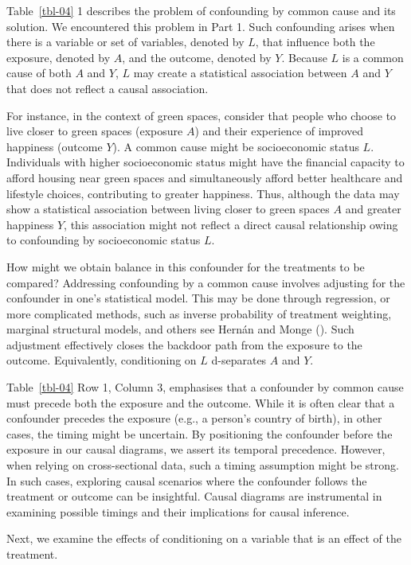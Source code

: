 \documentclass[
  singlecolumn]{article}
\begin{document}
Table~\ref{tbl-04} 1 describes the problem of confounding by common
cause and its solution. We encountered this problem in Part 1. Such
confounding arises when there is a variable or set of variables, denoted
by \(L\), that influence both the exposure, denoted by \(A\), and the
outcome, denoted by \(Y.\) Because \(L\) is a common cause of both \(A\)
and \(Y\), \(L\) may create a statistical association between \(A\) and
\(Y\) that does not reflect a causal association.

For instance, in the context of green spaces, consider that people who
choose to live closer to green spaces (exposure \(A\)) and their
experience of improved happiness (outcome \(Y\)). A common cause might
be socioeconomic status \(L\). Individuals with higher socioeconomic
status might have the financial capacity to afford housing near green
spaces and simultaneously afford better healthcare and lifestyle
choices, contributing to greater happiness. Thus, although the data may
show a statistical association between living closer to green spaces
\(A\) and greater happiness \(Y\), this association might not reflect a
direct causal relationship owing to confounding by socioeconomic status
\(L\).

How might we obtain balance in this confounder for the treatments to be
compared? Addressing confounding by a common cause involves adjusting
for the confounder in one's statistical model. This may be done through
regression, or more complicated methods, such as inverse probability of
treatment weighting, marginal structural models, and others see Hernán
and Monge (). Such adjustment
effectively closes the backdoor path from the exposure to the outcome.
Equivalently, conditioning on \(L\) d-separates \(A\) and \(Y\).

Table~\ref{tbl-04} Row 1, Column 3, emphasises that a confounder by
common cause must precede both the exposure and the outcome. While it is
often clear that a confounder precedes the exposure (e.g., a person's
country of birth), in other cases, the timing might be uncertain. By
positioning the confounder before the exposure in our causal diagrams,
we assert its temporal precedence. However, when relying on
cross-sectional data, such a timing assumption might be strong. In such
cases, exploring causal scenarios where the confounder follows the
treatment or outcome can be insightful. Causal diagrams are instrumental
in examining possible timings and their implications for causal
inference.

Next, we examine the effects of conditioning on a variable that is an
effect of the treatment.
\end{document}
